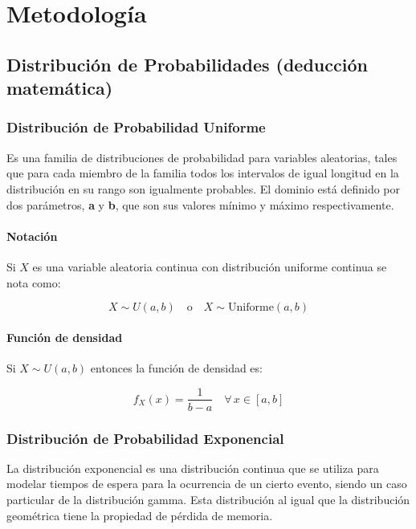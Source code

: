 \documentclass{article}
\begin{document}
\section{Metodología}
\label{sec:metodologia}

\subsection{Distribución de Probabilidades (deducción matemática)}

\subsubsection{Distribución de Probabilidad Uniforme}

Es una familia de distribuciones de probabilidad para variables aleatorias, tales que para
cada miembro de la familia todos los intervalos de igual longitud en la distribución en su
rango son igualmente probables. El dominio está definido por dos parámetros,
\textbf{a} y \textbf{b}, que son sus valores mínimo y máximo respectivamente.

\paragraph{Notación}

Si $X$ es una variable aleatoria continua con distribución uniforme continua se nota como:

\begin{equation}
    X \sim U(a, b) \quad \text{o} \quad X \sim \mathrm{Uniforme}(a, b)
\end{equation}

\paragraph{Función de densidad}

Si $X \sim U(a, b)$ entonces la función de densidad es:

\begin{equation}
    f_X(x) = \frac{1}{b - a} \quad \forall\, x \in [a, b]
\end{equation}


\subsubsection{Distribución de Probabilidad Exponencial}

La distribución exponencial es una distribución continua que se utiliza para modelar
tiempos de espera para la ocurrencia de un cierto evento, siendo un caso particular de la
distribución gamma.
Esta distribución al igual que la distribución geométrica tiene la propiedad de pérdida de
memoria.
\end{document}
